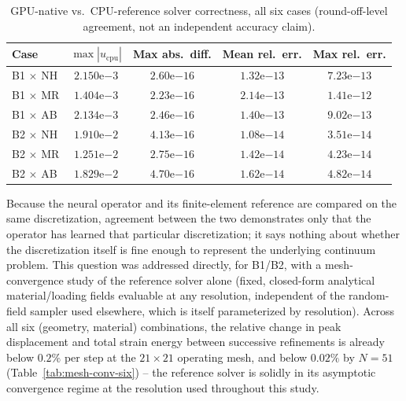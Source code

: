 \documentclass[final,5p,times]{elsarticle}
\begin{document}
\begin{table}[h]
\centering
\caption{GPU-native vs.\ CPU-reference solver correctness, all six cases
  (round-off-level agreement, not an independent accuracy claim).}
\label{tab:fem-correctness}
\footnotesize
\setlength{\tabcolsep}{3pt}
\begin{tabular}{lcccc}
\toprule
Case & $\max|u_{\text{cpu}}|$ & Max abs.\ diff. & Mean rel.\ err. & Max rel.\ err. \\
\midrule
B1 $\times$ NH & $2.150\mathrm{e}{-3}$ & $2.60\mathrm{e}{-16}$ & $1.32\mathrm{e}{-13}$ & $7.23\mathrm{e}{-13}$ \\
B1 $\times$ MR & $1.404\mathrm{e}{-3}$ & $2.23\mathrm{e}{-16}$ & $2.14\mathrm{e}{-13}$ & $1.41\mathrm{e}{-12}$ \\
B1 $\times$ AB & $2.134\mathrm{e}{-3}$ & $2.46\mathrm{e}{-16}$ & $1.40\mathrm{e}{-13}$ & $9.02\mathrm{e}{-13}$ \\
B2 $\times$ NH & $1.910\mathrm{e}{-2}$ & $4.13\mathrm{e}{-16}$ & $1.08\mathrm{e}{-14}$ & $3.51\mathrm{e}{-14}$ \\
B2 $\times$ MR & $1.251\mathrm{e}{-2}$ & $2.75\mathrm{e}{-16}$ & $1.42\mathrm{e}{-14}$ & $4.23\mathrm{e}{-14}$ \\
B2 $\times$ AB & $1.829\mathrm{e}{-2}$ & $4.70\mathrm{e}{-16}$ & $1.62\mathrm{e}{-14}$ & $4.82\mathrm{e}{-14}$ \\
\bottomrule
\end{tabular}
\end{table}

Because the neural operator and its finite-element reference are compared on
the same discretization, agreement between the two demonstrates only that
the operator has learned that particular discretization; it says nothing
about whether the discretization itself is fine enough to represent the
underlying continuum problem. This question was addressed directly, for
B1/B2, with a mesh-convergence study of the reference solver alone (fixed,
closed-form analytical material/loading fields evaluable at any resolution,
independent of the random-field sampler used elsewhere, which is itself
parameterized by resolution). Across all six (geometry, material)
combinations, the relative change in peak displacement and total strain
energy between successive refinements is already below $0.2\%$ per step at
the $21\times21$ operating mesh, and below $0.02\%$ by $N{=}51$
(Table~\ref{tab:mesh-conv-six}) -- the reference solver is solidly in its
asymptotic convergence regime at the resolution used throughout this
study.
\end{document}
